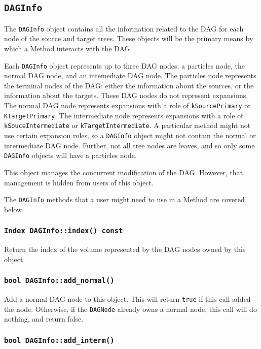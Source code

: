 \subsection{\texttt{DAGInfo}}

The \texttt{DAGInfo} object contains all the information related to the DAG
for each node of the source and target trees. These objects will be the
primary means by which a Method interacts with the DAG.

Each \texttt{DAGInfo} object represents up to three DAG nodes: a particles
node, the normal DAG node, and an intemediate DAG node. The particles node
represents the terminal nodes of the DAG: either the information about
the sources, or the information about the targets. These DAG nodes do not
represent expansions. The normal
DAG node represents expansions with a role of \texttt{kSourcePrimary} or
\texttt{KTargetPrimary}. The intermediate node represents expansions with a
role of \texttt{kSouceIntermediate} or \texttt{kTargetIntermediate}. A
particular method might not use certain expansion roles, so a
\texttt{DAGInfo} object might not contain the normal or intermediate DAG node.
Further, not all tree nodes are leaves, and so only some \texttt{DAGInfo}
objects will have a particles node.

This object manages the concurrent modification of the DAG. However, that
management is hidden from users of this object.

The \texttt{DAGInfo} methods that a user might need to use in a Method are
covered below.

\subsubsection{\texttt{Index DAGInfo::index() const}}

Return the index of the volume represented by the DAG nodes owned by this
object.

\subsubsection{\texttt{bool DAGInfo::add\_normal()}}

Add a normal DAG node to this object. This will return \texttt{true} if this
call added the node. Otherwise, if the \texttt{DAGNode} already owns a normal
node, this call will do nothing, and return false.

\subsubsection{\texttt{bool DAGInfo::add\_interm()}}

